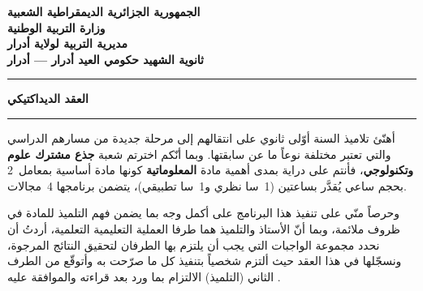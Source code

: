 \documentclass[12pt, a4paper]{article}
\begin{document}
\begin{center}

  \begin{headerbox}
    \centering
    \large
    \textbf{الجمهورية الجزائرية الديمقراطية الشعبية} \\[6pt]
    \textbf{وزارة التربية الوطنية} \\[6pt]
    \textbf{مديرية التربية لولاية أدرار} \\[6pt]
    \textbf{ثانوية الشهيد حكومي العيد أدرار — أدرار}
  \end{headerbox}

  \vspace{1cm}

  {\color{accent}\rule{\textwidth}{2pt}}

  \vspace{0.6cm}

  {\Huge\bfseries\color{primary} العقد الديداكتيكي}


  {\color{accent}\rule{\textwidth}{2pt}}

  \vspace{0.8cm}

\end{center}

\begin{contractbox}[التمهيد]
  أهنّئ تلاميذ السنة أوّلى ثانوي على انتقالهم إلى مرحلة جديدة من مسارهم
  الدراسي والتي تعتبر مختلفة نوعاً ما عن سابقتها. وبما أنّكم اخترتم شعبة
  \textbf{جذع مشترك علوم وتكنولوجي}، فأنتم على دراية بمدى أهمية مادة
  \textbf{المعلوماتية} كونها مادة أساسية بمعامل~2 بحجم ساعي يُقدَّر
  بساعتين (1~سا نظري و1~سا تطبيقي)، يتضمن برنامجها 4~مجالات.


  وحرصاً منّي على تنفيذ هذا البرنامج على أكمل وجه بما يضمن فهم التلميذ
  للمادة في ظروف ملائمة، وبما أنّ الأستاذ والتلميذ هما طرفا العملية
  التعليمية التعلمية، أردتُ أن نحدد مجموعة الواجبات التي يجب أن يلتزم بها
  الطرفان لتحقيق النتائج المرجوة، ونسجّلها في هذا العقد حيث ألتزم شخصياً
  بتنفيذ كل ما صرّحت به وأتوقّع من الطرف الثاني (التلميذ) الالتزام بما
  ورد بعد قراءته والموافقة عليه .
\end{contractbox}
\end{document}
